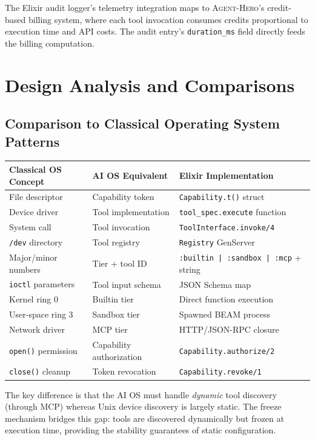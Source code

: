 \documentclass[12pt,a4paper]{article}
\theoremstyle{plain}
\theoremstyle{definition}
\newcommand{\agenthero}{\textsc{Agent-Hero}}
\begin{document}
The Elixir audit logger's telemetry integration maps to \agenthero{}'s credit-based billing system, where each tool invocation consumes credits proportional to execution time and API costs. The audit entry's \texttt{duration\_ms} field directly feeds the billing computation.


\section{Design Analysis and Comparisons}
\label{sec:analysis}

\subsection{Comparison to Classical Operating System Patterns}

\begin{center}
\begin{tabularx}{\textwidth}{lXX}
\toprule
\textbf{Classical OS Concept} & \textbf{AI OS Equivalent} & \textbf{Elixir Implementation} \\
\midrule
File descriptor & Capability token & \texttt{Capability.t()} struct \\
Device driver & Tool implementation & \texttt{tool\_spec.execute} function \\
System call & Tool invocation & \texttt{ToolInterface.invoke/4} \\
\texttt{/dev} directory & Tool registry & \texttt{Registry} GenServer \\
Major/minor numbers & Tier + tool ID & \texttt{:builtin | :sandbox | :mcp} + string \\
\texttt{ioctl} parameters & Tool input schema & JSON Schema map \\
Kernel ring 0 & Builtin tier & Direct function execution \\
User-space ring 3 & Sandbox tier & Spawned BEAM process \\
Network driver & MCP tier & HTTP/JSON-RPC closure \\
\texttt{open()} permission & Capability authorization & \texttt{Capability.authorize/2} \\
\texttt{close()} cleanup & Token revocation & \texttt{Capability.revoke/1} \\
\bottomrule
\end{tabularx}
\end{center}

The key difference is that the AI OS must handle \emph{dynamic} tool discovery (through MCP) whereas Unix device discovery is largely static. The freeze mechanism bridges this gap: tools are discovered dynamically but frozen at execution time, providing the stability guarantees of static configuration.
\end{document}
